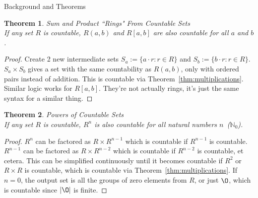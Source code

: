 \documentclass[12pt]{article}
\newtheorem{thm}{Theorem}
\begin{document}
\begin{section}{Background and Theorems}
	\begin{thm}\label{thm:rings}
		\emph{Sum and Product ``Rings" From Countable Sets}\\
		\indent\emph{If any set $R$ is countable, $R(a, b)$ and $R[a, b]$ are also countable
		for all $a$ and $b$.}
	\end{thm}\begin{proof}
		Create 2 new intermediate sets $S_a := \{a\cdot r:r\in R\}$ and $S_b := \{b\cdot r:r\in R\}$.
		$S_a\times S_b$ gives a set with the same countability as $R(a,b)$, only with
		ordered pairs instead of addition. This is countable via Theorem~\ref{thm:multiplications}.
		Similar logic works for $R[a,b]$. They're not actually rings, it's just the same syntax for
		a similar thing.
	\end{proof}

	\begin{thm}\label{thm:powers}
		\emph{Powers of Countable Sets}\\
		\indent\emph{If any set $R$ is countable, $R^n$ is also countable for all natural numbers $n$
		\,($\mathbb N_0$).}
	\end{thm}\begin{proof}
		$R^n$ can be factored as $R\times R^{n-1}$ which is countable if $R^{n-1}$ is countable.
		$R^{n-1}$ can be factored as $R\times R^{n-2}$ which is countable if $R^{n-2}$ is countable,
		et cetera. This can be simplified continuously until it becomes countable if $R^2$ or
		$R\times R$ is countable, which is countable via Theorem~\ref{thm:multiplications}. If $n=0$,
		the output set is all the groups of zero elements from $R$, or just $\O$, which is countable
		since $\left|\O\right|$ is finite. 
	\end{proof}


\end{section}
\end{document}
